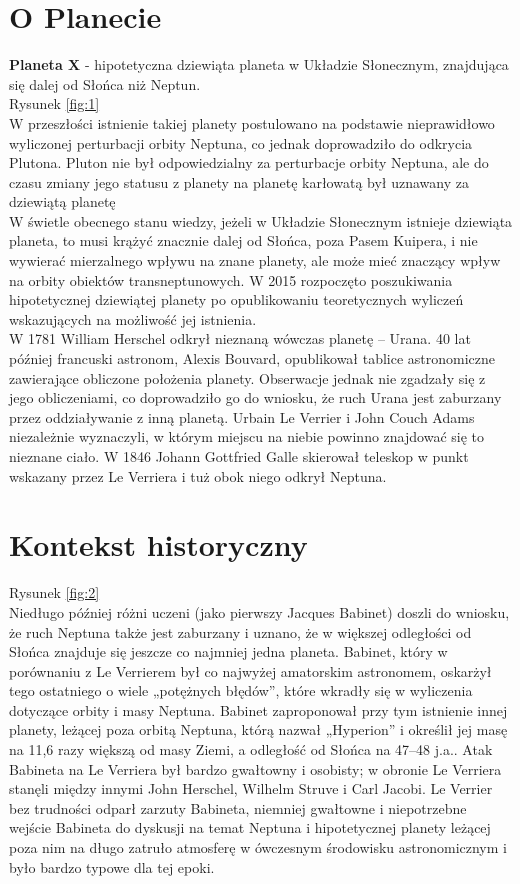 \documentclass[12pt]{article}
\begin{document}
\section{O Planecie}
{\bf Planeta X} - hipotetyczna dziewiąta planeta w Układzie Słonecznym, znajdująca się dalej od Słońca niż Neptun.\\
Rysunek \ref{fig:1}\\
W przeszłości istnienie takiej planety postulowano na podstawie nieprawidłowo wyliczonej perturbacji orbity Neptuna, co jednak doprowadziło do odkrycia Plutona. Pluton nie był odpowiedzialny za perturbacje orbity Neptuna, ale do czasu zmiany jego statusu z planety na planetę karłowatą był uznawany za dziewiątą planetę\\

W świetle obecnego stanu wiedzy, jeżeli w Układzie Słonecznym istnieje dziewiąta planeta, to musi krążyć znacznie dalej od Słońca, poza Pasem Kuipera, i nie wywierać mierzalnego wpływu na znane planety, ale może mieć znaczący wpływ na orbity obiektów transneptunowych. W 2015 rozpoczęto poszukiwania hipotetycznej dziewiątej planety po opublikowaniu teoretycznych wyliczeń wskazujących na możliwość jej istnienia.\\

W 1781 William Herschel odkrył nieznaną wówczas planetę – Urana. 40 lat później francuski astronom, Alexis Bouvard, opublikował tablice astronomiczne zawierające obliczone położenia planety. Obserwacje jednak nie zgadzały się z jego obliczeniami, co doprowadziło go do wniosku, że ruch Urana jest zaburzany przez oddziaływanie z inną planetą. Urbain Le Verrier i John Couch Adams niezależnie wyznaczyli, w którym miejscu na niebie powinno znajdować się to nieznane ciało. W 1846 Johann Gottfried Galle skierował teleskop w punkt wskazany przez Le Verriera i tuż obok niego odkrył Neptuna.\\
\section{Kontekst historyczny}
Rysunek \ref{fig:2}\\
Niedługo później różni uczeni (jako pierwszy Jacques Babinet) doszli do wniosku, że ruch Neptuna także jest zaburzany i uznano, że w większej odległości od Słońca znajduje się jeszcze co najmniej jedna planeta. Babinet, który w porównaniu z Le Verrierem był co najwyżej amatorskim astronomem, oskarżył tego ostatniego o wiele „potężnych błędów”, które wkradły się w wyliczenia dotyczące orbity i masy Neptuna. Babinet zaproponował przy tym istnienie innej planety, leżącej poza orbitą Neptuna, którą nazwał „Hyperion” i określił jej masę na 11,6 razy większą od masy Ziemi, a odległość od Słońca na 47–48 j.a.. Atak Babineta na Le Verriera był bardzo gwałtowny i osobisty; w obronie Le Verriera stanęli między innymi John Herschel, Wilhelm Struve i Carl Jacobi. Le Verrier bez trudności odparł zarzuty Babineta, niemniej gwałtowne i niepotrzebne wejście Babineta do dyskusji na temat Neptuna i hipotetycznej planety leżącej poza nim na długo zatruło atmosferę w ówczesnym środowisku astronomicznym i było bardzo typowe dla tej epoki.\\
\end{document}
